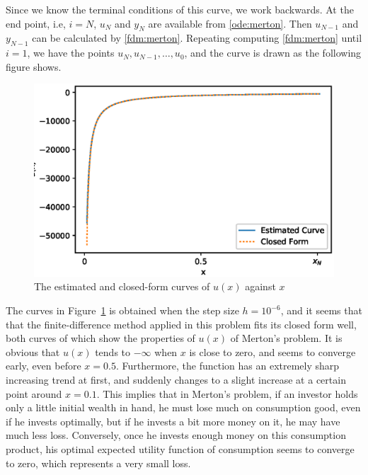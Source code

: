 \documentclass[a4paper]{article}
\theoremstyle{definition}
\numberwithin{equation}{section}
\begin{document}
Since we know the terminal conditions of this curve, we work backwards. At the end point, i.e, $i=N$, $u_N$ and $y_N$ are available from \eqref{ode:merton}. Then $u_{N-1}$ and $y_{N-1}$ can be calculated by \eqref{fdm:merton}. Repeating computing \eqref{fdm:merton} until $i=1$, we have the points $u_N,u_{N-1},\dots,u_0$, and the curve is drawn as the following figure shows.
\begin{figure}[H]
\centering
\includegraphics[scale=0.6]{MertonV.eps}
\caption{The estimated and closed-form curves of $u(x)$ against $x$}
\label{fig:Merton}
\end{figure}

The curves in Figure~\ref{fig:Merton} is obtained when the step size $h=10^{-6}$, and it seems that that the finite-difference method applied in this problem fits its closed form well, both curves of which show the properties of $u(x)$ of Merton's problem. It is obvious that $u(x)$ tends to $-\infty$ when $x$ is close to zero, and seems to converge early, even before $x=0.5$. Furthermore, the function has an extremely sharp increasing trend at first, and suddenly changes to a slight increase at a certain point around $x=0.1$. This implies that in Merton's problem, if an investor holds only a little initial wealth in hand, he must lose much on consumption good, even if he invests optimally, but if he invests a bit more money on it, he may have much less loss. Conversely, once he invests enough money on this consumption product, his optimal expected utility function of consumption seems to converge to zero, which represents a very small loss.
\end{document}

